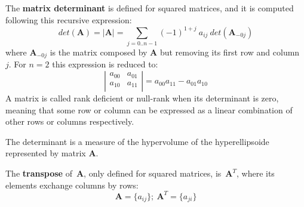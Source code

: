 The \textbf{matrix determinant} is defined for squared matrices, and it is computed following this recursive expression: 
\begin{equation}
det(\mathbf{A}) = |\mathbf{A}| = \sum_{j=0..n-1} (-1)^{1+j}\ a_{ij}\ det(\mathbf{A}_{-0j})
\end{equation}
where $\mathbf{A}_{-0j}$ is the matrix composed by $\mathbf{A}$ but removing its first row and column~$j$. For $n=2$ this expression is reduced to:  
\begin{equation}
\left|
\begin{array}{cc}
  a_{00} & a_{01}\\
  a_{10} & a_{11} \\
\end{array}
\right| = 
a_{00}a_{11} - a_{01}a_{10}
\end{equation}
A matrix is called rank deficient or null-rank when its determinant is zero, meaning that some row or column can be expressed as a linear combination of other rows or columns respectively.

The determinant is a measure of the hypervolume of the hyperellipsoide represented by matrix $\mathbf{A}$. 



The \textbf{transpose} of~$\mathbf{A}$, only defined for squared matrices, is~$\mathbf{A}^T$, where its elements exchange columns by rows: 
\begin{equation}
 \mathbf{A} = \{a_{ij}\}; \ \mathbf{A}^T =\{a_{ji}\} 
\end{equation}


